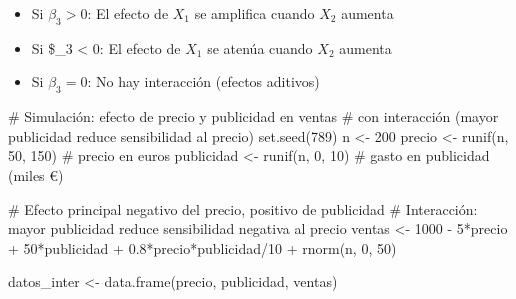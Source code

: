 \documentclass[
  letterpaper,
  DIV=11,
  numbers=noendperiod]{scrreprt}
\newenvironment{Shaded}{\begin{snugshade}}{\end{snugshade}}
\newcommand{\CommentTok}[1]{\textcolor[rgb]{0.37,0.37,0.37}{#1}}
\newcommand{\DecValTok}[1]{\textcolor[rgb]{0.68,0.00,0.00}{#1}}
\newcommand{\FloatTok}[1]{\textcolor[rgb]{0.68,0.00,0.00}{#1}}
\newcommand{\FunctionTok}[1]{\textcolor[rgb]{0.28,0.35,0.67}{#1}}
\newcommand{\NormalTok}[1]{\textcolor[rgb]{0.00,0.23,0.31}{#1}}
\newcommand{\OtherTok}[1]{\textcolor[rgb]{0.00,0.23,0.31}{#1}}
\newcommand{\SpecialCharTok}[1]{\textcolor[rgb]{0.37,0.37,0.37}{#1}}
\providecommand{\tightlist}{%
  \setlength{\itemsep}{0pt}\setlength{\parskip}{0pt}}
\begin{document}
\begin{itemize}
\tightlist
\item
  Si \(\beta_3 > 0\): El efecto de \(X_1\) se amplifica cuando \(X_2\)
  aumenta
\item
  Si \$\beta\_3 \textless{} 0: El efecto de \(X_1\) se atenúa cuando
  \(X_2\) aumenta
\item
  Si \(\beta_3 = 0\): No hay interacción (efectos aditivos)
\end{itemize}

\begin{tcolorbox}[enhanced jigsaw, breakable, toprule=.15mm, bottomtitle=1mm, coltitle=black, colbacktitle=quarto-callout-tip-color!10!white, titlerule=0mm, opacitybacktitle=0.6, bottomrule=.15mm, toptitle=1mm, title=\textcolor{quarto-callout-tip-color}{\faLightbulb}\hspace{0.5em}{Ejemplo: Interacción precio-publicidad en ventas}, arc=.35mm, rightrule=.15mm, opacityback=0, colframe=quarto-callout-tip-color-frame, leftrule=.75mm, left=2mm, colback=white]

\begin{Shaded}
\begin{Highlighting}[]
\CommentTok{\# Simulación: efecto de precio y publicidad en ventas}
\CommentTok{\# con interacción (mayor publicidad reduce sensibilidad al precio)}
\FunctionTok{set.seed}\NormalTok{(}\DecValTok{789}\NormalTok{)}
\NormalTok{n }\OtherTok{\textless{}{-}} \DecValTok{200}
\NormalTok{precio }\OtherTok{\textless{}{-}} \FunctionTok{runif}\NormalTok{(n, }\DecValTok{50}\NormalTok{, }\DecValTok{150}\NormalTok{)  }\CommentTok{\# precio en euros}
\NormalTok{publicidad }\OtherTok{\textless{}{-}} \FunctionTok{runif}\NormalTok{(n, }\DecValTok{0}\NormalTok{, }\DecValTok{10}\NormalTok{)  }\CommentTok{\# gasto en publicidad (miles €)}

\CommentTok{\# Efecto principal negativo del precio, positivo de publicidad}
\CommentTok{\# Interacción: mayor publicidad reduce sensibilidad negativa al precio}
\NormalTok{ventas }\OtherTok{\textless{}{-}} \DecValTok{1000} \SpecialCharTok{{-}} \DecValTok{5}\SpecialCharTok{*}\NormalTok{precio }\SpecialCharTok{+} \DecValTok{50}\SpecialCharTok{*}\NormalTok{publicidad }\SpecialCharTok{+} \FloatTok{0.8}\SpecialCharTok{*}\NormalTok{precio}\SpecialCharTok{*}\NormalTok{publicidad}\SpecialCharTok{/}\DecValTok{10} \SpecialCharTok{+} 
          \FunctionTok{rnorm}\NormalTok{(n, }\DecValTok{0}\NormalTok{, }\DecValTok{50}\NormalTok{)}

\NormalTok{datos\_inter }\OtherTok{\textless{}{-}} \FunctionTok{data.frame}\NormalTok{(precio, publicidad, ventas)}


\end{Highlighting}
\end{Shaded}
\end{tcolorbox}
\end{document}
